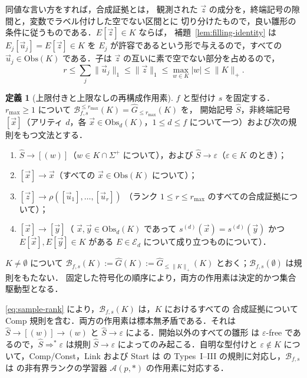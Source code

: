 \documentclass[11pt,a4paper]{ltjsarticle}
\numberwithin{equation}{section}
\theoremstyle{plain}
\theoremstyle{definition}
\newtheorem{definition}[theorem]{定義}
\theoremstyle{remark}
\newcommand{\tuple}[1]{\vec{#1}}
\newcommand{\eps}{\varepsilon}
\theoremstyle{plain}
\begin{document}
同値な言い方をすれば，合成証拠とは，
観測された $\tuple z$ の成分を，終端記号の隙間と，変数でラベル付けした空でない区間とに
切り分けたもので，良い雛形の条件に従うものである．$E[\tuple z]\in K$ ならば，
補題~\ref{lem:filling-identity} は $E_j[\tuple u_j]=E[\tuple z]\in K$ を
$E_j$ が許容であるという形で与えるので，すべての $\tuple u_j\in\mathrm{Obs}(K)$ である．子は
$\tuple z$ の互いに素で空でない部分を占めるので，
\begin{equation}
\label{eq:sample-rank}
 r\le\textstyle\sum_j\|\tuple u_j\|_1\le\|\tuple z\|_1\le\max_{w\in K}|w|
 \le\|K\|_+ .
\end{equation}

\begin{definition}[上限付きと上限なしの再構成作用素]
\label{def:reconstruction}
$f$ と型付け $s$ を固定する．$r_{\max}\ge1$ について
$\mathcal B_{f,s}^{\le r_{\max}}(K)=\widehat G_{\le r_{\max}}(K)$ を，
開始記号 $\widehat S$，非終端記号 $[\tuple x]$（アリティ
$d$，各 $\tuple x\in\mathrm{Obs}_d(K)$，$1\le d\le f$ について一つ）および次の規則をもつ文法とする．
\begin{enumerate}[leftmargin=*]
\item[\textnormal{(Start)}] $\widehat S\to[(w)]$（$w\in K\cap\Sigma^+$ について），および
      $\widehat S\to\eps$（$\eps\in K$ のとき）；
\item[\textnormal{(Const)}] $[\tuple x]\to\tuple x$（すべての
      $\tuple x\in\mathrm{Obs}(K)$ について）；
\item[\textnormal{(Comp)}] $[\tuple z]\to\rho([\tuple u_1],\ldots,[\tuple u_r])$
      （ランク $1\le r\le r_{\max}$ のすべての合成証拠について）；
\item[\textnormal{(Link)}] $[\tuple x]\to[\tuple y]$（
      $\tuple x,\tuple y\in\mathrm{Obs}_d(K)$ であって
      $s^{(d)}(\tuple x)=s^{(d)}(\tuple y)$ かつ $E[\tuple x],E[\tuple y]\in K$
      がある $E\in\mathcal E_d$ について成り立つものについて）．
\end{enumerate}
$K\ne\emptyset$ について $\mathcal B_{f,s}(K):=\widehat G(K):=
\widehat G_{\le\|K\|_+}(K)$ とおく；$\mathcal B_{f,s}(\emptyset)$ は規則をもたない．
固定した符号化の順序により，両方の作用素は決定的かつ集合駆動型となる．
\end{definition}

\eqref{eq:sample-rank} により，$\mathcal B_{f,s}(K)$ は，$K$ におけるすべての
合成証拠について Comp 規則を含む．両方の作用素は標本無矛盾である．それは
$\widehat S\to[(w)]\to(w)$ と $\widehat S\to\eps$ による．開始以外のすべての雛形
は $\eps$-free であるので，$\widehat S\Rightarrow^*\eps$ は規則
$\widehat S\to\eps$ によってのみ起こる．自明な型付けと $\eps\notin K$ について，Comp/Const，Link
および Start は
\cite[Section~4.1]{Yoshinaka2011} の Types~I--III の規則に対応し，$\mathcal B_{f,s}$ は
\cite[Corollary~2]{Yoshinaka2011} の非有界ランクの学習器
$\mathcal A(p,*)$ の作用素に対応する．
\end{document}
